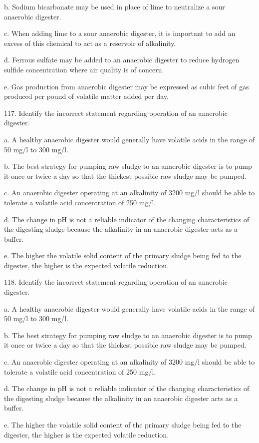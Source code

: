 \documentclass{article}
\begin{document}
b. Sodium bicarbonate may be used in place of lime to neutralize a sour anaerobic digester. 

c. When adding lime to a sour anaerobic digester, it is important to add an excess of this chemical to act as a reservoir of alkalinity. 

d. Ferrous sulfate may be added to an anaerobic digester to reduce hydrogen sulfide concentration where air quality is of concern. 

e. Gas production from anaerobic digester may be expressed as cubic feet of gas produced per pound of volatile matter added per day. 


117. Identify the incorrect statement regarding operation of an anaerobic digester. 

a. A healthy anaerobic digester would generally have volatile acids in the range of 50 mg/l to 300 mg/l. 

b. The best strategy for pumping raw sludge to an anaerobic digester is to pump it once or twice a day so that the thickest possible raw sludge may be pumped. 

c. An anaerobic digester operating at an alkalinity of 3200 mg/l should be able to tolerate a volatile acid concentration of 250 mg/l. 

d. The change in pH is not a reliable indicator of the changing characteristics of the digesting sludge because the alkalinity in an anaerobic digester acts as a buffer. 

e. The higher the volatile solid content of the primary sludge being fed to the digester, the higher is the expected volatile reduction. 


118. Identify the incorrect statement regarding operation of an anaerobic digester. 

a. A healthy anaerobic digester would generally have volatile acids in the range of 50 mg/l to 300 mg/l. 

b. The best strategy for pumping raw sludge to an anaerobic digester is to pump it once or twice a day so that the thickest possible raw sludge may be pumped. 

c. An anaerobic digester operating at an alkalinity of 3200 mg/l should be able to tolerate a volatile acid concentration of 250 mg/l. 

d. The change in pH is not a reliable indicator of the changing characteristics of the digesting sludge because the alkalinity in an anaerobic digester acts as a buffer. 

e. The higher the volatile solid content of the primary sludge being fed to the digester, the higher is the expected volatile reduction. 
\end{document}
